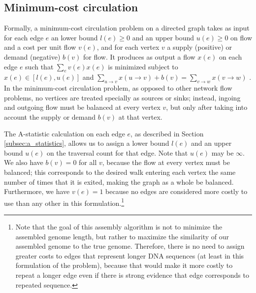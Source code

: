 \documentclass[12pt]{article}
\newcommand{\Subsection}[1]{Section \ref{#1}}
\begin{document}
\label{subsec:mapping_contained_reads}

\subsection{Minimum-cost circulation}

\label{subsec:circulation}

Formally, a minimum-cost circulation problem on a directed graph takes as input
for each edge $e$ an lower bound $l(e) \ge 0$ and an upper bound $u(e) \ge 0$ on
flow and a cost per unit flow $v(e)$, and for each vertex $v$ a supply
(positive) or demand (negative) $b(v)$ for flow.  It produces as output a flow
$x(e)$ on each edge $e$ such that $\sum_e v(e)x(e)$ is minimized subject to
$x(e) \in [l(e), u(e)]$ and $\sum_{u \to v}x(u \to v) + b(v) = \sum_{v \to w}
x(v \to w)$ \cite{Myers2005}.  In the minimum-cost circulation problem, as
opposed to other network flow problems, no vertices are treated specially as
sources or sinks; instead, ingoing and outgoing flow must be balanced at every
vertex $v$, but only after taking into account the supply or demand $b(v)$ at
that vertex.

The A-statistic calculation on each edge $e$, as described in
\Subsection{subsec:a_statistics}, allows us to assign a lower bound $l(e)$ and
an upper bound $u(e)$ on the traversal count for that edge.  Note that $u(e)$
may be $\infty$.  We also have $b(v) = 0$ for all $v$, because the flow at every
vertex must be balanced; this corresponds to the desired walk entering each
vertex the same number of times that it is exited, making the graph as a whole
be balanced.  Furthermore, we have $v(e) = 1$ because no edges are considered
more costly to use than any other in this formulation.\footnote{Note that the
goal of this assembly algorithm is not to minimize the assembled genome length,
but rather to maximize the similarity of our assembled genome to the true
genome.  Therefore, there is no need to assign greater costs to edges that
represent longer DNA sequences (at least in this formulation of the problem),
because that would make it more costly to repeat a longer edge even if there is
strong evidence that edge corresponds to repeated sequence.}


\end{document}

